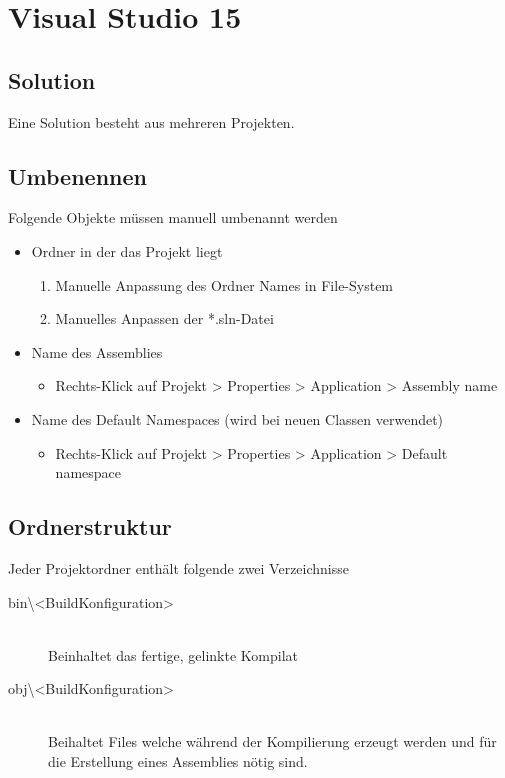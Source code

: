 \documentclass[
a4paper,
oneside,
10pt,
fleqn,
headsepline,
toc=listofnumbered, 
bibliography=totocnumbered]{scrartcl}
\let\stdsection\section
\renewcommand\section{\clearpage\stdsection}
\begin{document}
\section{Visual Studio 15}
\subsection{Solution}
Eine Solution besteht aus mehreren Projekten.

\subsection{Umbenennen}
Folgende Objekte müssen manuell umbenannt werden
\begin{itemize}
	\item Ordner in der das Projekt liegt 
	\begin{enumerate}
		\item Manuelle Anpassung des Ordner Names in File-System
		\item  Manuelles Anpassen der *.sln-Datei
	\end{enumerate}
	\item Name des Assemblies
	\begin{itemize}
		\item Rechts-Klick auf Projekt > Properties > Application > Assembly name
	\end{itemize}
	\item Name des Default Namespaces (wird bei neuen Classen verwendet)
	\begin{itemize}
		\item Rechts-Klick auf Projekt > Properties > Application > Default namespace
	\end{itemize}
\end{itemize}

\subsection{Ordnerstruktur}
Jeder Projektordner enthält folgende zwei Verzeichnisse
\begin{description}
	\item[bin\textbackslash<BuildKonfiguration>] \hfill \\
	Beinhaltet das fertige, gelinkte Kompilat
	\item[obj\textbackslash<BuildKonfiguration>] \hfill \\
	Beihaltet Files welche während der Kompilierung erzeugt werden und für die Erstellung eines Assemblies nötig sind.
\end{description}
\end{document}
